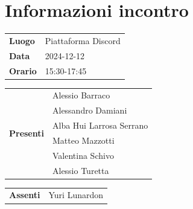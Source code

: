 \section{Informazioni incontro}
\vspace{0.25cm}
\begin{tabular}{p{1.75cm} | l}
    \textbf{Luogo} & Piattaforma Discord\\
    \textbf{Data} & 2024-12-12\\
    \textbf{Orario} & 15:30-17:45\\
\end{tabular}

\vspace{0.5cm}
\noindent
\begin{tabular}{p{1.75cm} | l}
    \multirow{7}{*}{\textbf{Presenti}}
        & Alessio Barraco\\
        & Alessandro Damiani\\ %
        & Alba Hui Larrosa Serrano\\
        & Matteo Mazzotti\\
        & Valentina Schivo\\
        & Alessio Turetta
\end{tabular}

\vspace{0.5cm}
\noindent
\begin{tabular}{p{1.75cm} | l}
    \multirow{1}{*}{\textbf{Assenti}}
        & Yuri Lunardon\\
\end{tabular}